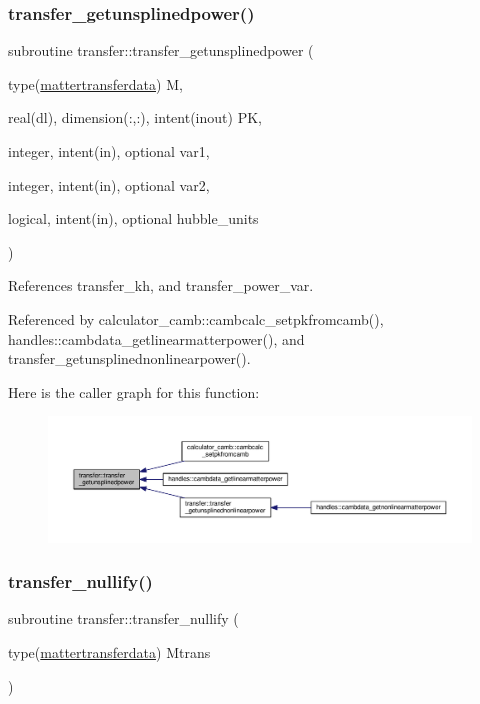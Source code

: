 \subsubsection{\texorpdfstring{transfer\+\_\+getunsplinedpower()}{transfer\_getunsplinedpower()}}
{\footnotesize\ttfamily subroutine transfer\+::transfer\+\_\+getunsplinedpower (\begin{DoxyParamCaption}\item[{type(\mbox{\hyperlink{structtransfer_1_1mattertransferdata}{mattertransferdata}})}]{M,  }\item[{real(dl), dimension(\+:,\+:), intent(inout)}]{PK,  }\item[{integer, intent(in), optional}]{var1,  }\item[{integer, intent(in), optional}]{var2,  }\item[{logical, intent(in), optional}]{hubble\+\_\+units }\end{DoxyParamCaption})}



References transfer\+\_\+kh, and transfer\+\_\+power\+\_\+var.



Referenced by calculator\+\_\+camb\+::cambcalc\+\_\+setpkfromcamb(), handles\+::cambdata\+\_\+getlinearmatterpower(), and transfer\+\_\+getunsplinednonlinearpower().

Here is the caller graph for this function\+:
\nopagebreak
\begin{figure}[H]
\begin{center}
\leavevmode
\includegraphics[width=350pt]{namespacetransfer_af736a104130d0ba0ffbadfa62d245747_icgraph}
\end{center}
\end{figure}
\mbox{\label{namespacetransfer_a0e02ff3d1ba9dd5ad8c5dcaf76987ecc}} 
\subsubsection{\texorpdfstring{transfer\+\_\+nullify()}{transfer\_nullify()}}
{\footnotesize\ttfamily subroutine transfer\+::transfer\+\_\+nullify (\begin{DoxyParamCaption}\item[{type(\mbox{\hyperlink{structtransfer_1_1mattertransferdata}{mattertransferdata}})}]{Mtrans }\end{DoxyParamCaption})}



